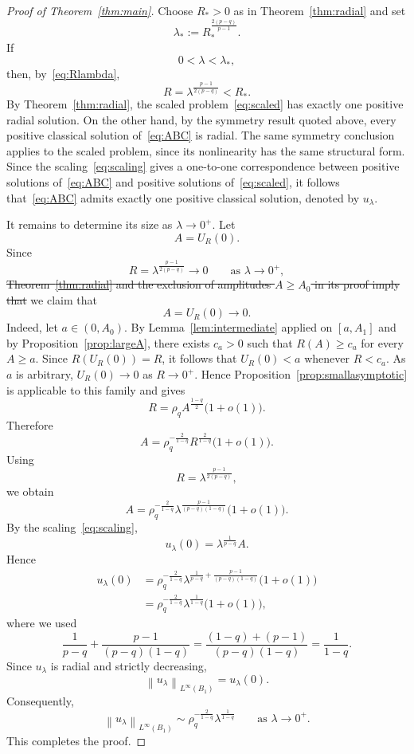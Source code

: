 \documentclass[11pt]{article}
\newcommand{\norm}[1]{\left\|#1\right\|}
\newcommand{\add}[1]{{\color{blue}#1}}
\newcommand{\del}[1]{{\color{red}\sout{#1}}}
\newcommand{\oldrev}[1]{#1}
\theoremstyle{definition}
\begin{document}
\begin{proof}[Proof of Theorem~\ref{thm:main}]
Choose $R_*>0$ as in Theorem~\ref{thm:radial} and set
\[
\lambda_*
:=
R_*^{\frac{2(p-q)}{p-1}}.
\]
If
\[
0<\lambda<\lambda_*,
\]
then, by~\eqref{eq:Rlambda},
\[
R
=
\lambda^{\frac{p-1}{2(p-q)}}
<
R_*.
\]
By Theorem~\ref{thm:radial}, the scaled
problem~\eqref{eq:scaled} has exactly one positive radial solution.
On the other hand, by the symmetry result quoted above, every
positive classical solution of~\eqref{eq:ABC} is radial.
\oldrev{The same symmetry conclusion applies to the scaled
problem, since its nonlinearity has the same structural form.}
Since the
scaling~\eqref{eq:scaling} gives a one-to-one correspondence between
positive solutions of~\eqref{eq:ABC} and positive solutions
of~\eqref{eq:scaled}, it follows that~\eqref{eq:ABC} admits exactly
one positive classical solution, denoted by $u_\lambda$.

It remains to determine its size as $\lambda\to0^+$. Let
\[
A=U_R(0).
\]
\oldrev{Since
\[
R=\lambda^{\frac{p-1}{2(p-q)}}\longrightarrow0
\qquad\text{as }\lambda\to0^+,
\]
\del{Theorem~\ref{thm:radial} and the exclusion of amplitudes
$A\geq A_0$ in its proof imply that}
\add{we claim that}
\[
A=U_R(0)\longrightarrow0.
\]
\add{Indeed, let $a\in(0,A_0)$. By Lemma~\ref{lem:intermediate}
applied on $[a,A_1]$ and by Proposition~\ref{prop:largeA}, there
exists $c_a>0$ such that $R(A)\geq c_a$ for every $A\geq a$. Since
$R(U_R(0))=R$, it follows that $U_R(0)<a$ whenever $R<c_a$. As $a$ is
arbitrary, $U_R(0)\to0$ as $R\to0^+$.}
Hence Proposition~\ref{prop:smallasymptotic} is applicable to this
family and gives}
\[
R
=
\rho_q A^{\frac{1-q}{2}}
\bigl(1+o(1)\bigr).
\]
Therefore
\[
A
=
\rho_q^{-\frac{2}{1-q}}
R^{\frac{2}{1-q}}
\bigl(1+o(1)\bigr).
\]
Using
\[
R
=
\lambda^{\frac{p-1}{2(p-q)}},
\]
we obtain
\[
A
=
\rho_q^{-\frac{2}{1-q}}
\lambda^{\frac{p-1}{(p-q)(1-q)}}
\bigl(1+o(1)\bigr).
\]
By the scaling~\eqref{eq:scaling},
\[
u_\lambda(0)
=
\lambda^{\frac1{p-q}}A.
\]
Hence
\begin{align*}
u_\lambda(0)
&=
\rho_q^{-\frac{2}{1-q}}
\lambda^{
\frac1{p-q}
+
\frac{p-1}{(p-q)(1-q)}
}
\bigl(1+o(1)\bigr)
\\
&=
\rho_q^{-\frac{2}{1-q}}
\lambda^{\frac1{1-q}}
\bigl(1+o(1)\bigr),
\end{align*}
\oldrev{where we used
\[
\frac1{p-q}
+
\frac{p-1}{(p-q)(1-q)}
=
\frac{(1-q)+(p-1)}{(p-q)(1-q)}
=
\frac1{1-q}.
\]}%
Since $u_\lambda$ is radial and strictly decreasing,
\[
\norm{u_\lambda}_{L^\infty(B_1)}
=
u_\lambda(0).
\]
Consequently,
\begin{equation}
\label{eq:main-asymptotic}
\norm{u_\lambda}_{L^\infty(B_1)}
\sim
\rho_q^{-\frac{2}{1-q}}
\lambda^{\frac1{1-q}}
\qquad
\text{as }\lambda\to0^+.
\end{equation}
This completes the proof.
\end{proof}
    
\end{document}
